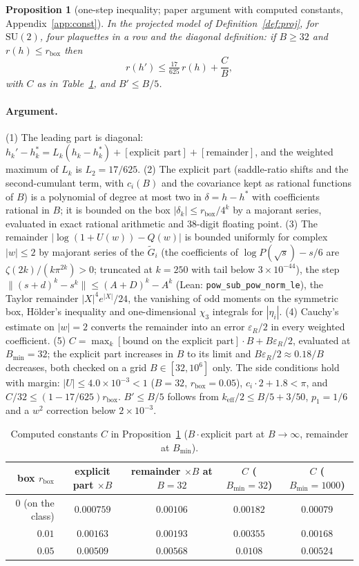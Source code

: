 \documentclass[11pt,a4paper]{article}
\newtheorem{proposition}[lemma]{Proposition}
\theoremstyle{definition}
\theoremstyle{remark}
\newcommand{\SU}{\mathrm{SU}(2)}
\newcommand{\code}[1]{\texttt{#1}}
\begin{document}
\begin{proposition}[one-step inequality; paper argument with computed constants, Appendix~\ref{app:const}]\label{prop:onestep}
In the projected model of Definition~\ref{def:proj}, for $\SU$, four plaquettes in a row and the diagonal definition: if $B\ge32$ and $r(h)\le r_{\mathrm{box}}$ then
\[
r(h')\le\tfrac{17}{625}\,r(h)+\frac{C}{B},
\]
with $C$ as in Table~\ref{tab:C}, and $B'\le B/5$.
\end{proposition}

\paragraph{Argument.}
(1) The leading part is diagonal: $h_k'-h_k^*=L_k(h_k-h_k^*)+[\text{explicit part}]+[\text{remainder}]$, and the weighted maximum of $L_k$ is $L_2=17/625$.
(2) The explicit part (saddle-ratio shifts and the second-cumulant term, with $c_i(B)$ and the covariance kept as rational functions of $B$) is a polynomial of degree at most two in $\delta=h-h^*$ with coefficients rational in $B$; it is bounded on the box $|\delta_k|\le r_{\mathrm{box}}/4^k$ by a majorant series, evaluated in exact rational arithmetic and 38-digit floating point.
(3) The remainder $|\log(1+U(w))-Q(w)|$ is bounded uniformly for complex $|w|\le2$ by majorant series of the $\tilde G_i$ (the coefficients of $\log P(\sqrt s)-s/6$ are $\zeta(2k)/(k\pi^{2k})>0$; truncated at $k=250$ with tail below $3\times10^{-44}$), the step $\|(s+d)^k-s^k\|\le(A+D)^k-A^k$ (Lean: \code{pow\_sub\_pow\_norm\_le}), the Taylor remainder $|X|^4e^{|X|}/24$, the vanishing of odd moments on the symmetric box, H\"older's inequality and one-dimensional $\chi_3$ integrals for $|\eta_i|$.
(4) Cauchy's estimate on $|w|=2$ converts the remainder into an error $\varepsilon_R/2$ in every weighted coefficient.
(5) $C=\max_k[\text{bound on the explicit part}]\cdot B+B\varepsilon_R/2$, evaluated at $B_{\min}=32$; the explicit part increases in $B$ to its limit and $B\varepsilon_R/2\approx0.18/B$ decreases, both checked on a grid $B\in[32,10^6]$ only.
The side conditions hold with margin: $|U|\le4.0\times10^{-3}<1$ ($B=32$, $r_{\mathrm{box}}=0.05$), $c_i\cdot2+1.8<\pi$, and $C/32\le(1-17/625)r_{\mathrm{box}}$.
$B'\le B/5$ follows from $k_{\mathrm{eff}}/2\le B/5+3/50$, $p_1=1/6$ and a $w^2$ correction below $2\times10^{-3}$.

\begin{table}[h]
\centering\small
\caption{Computed constants $C$ in Proposition~\ref{prop:onestep} ($B\cdot$explicit part at $B\to\infty$, remainder at $B_{\min}$).}\label{tab:C}
\begin{tabular}{@{}rcccc@{}}
\toprule
box $r_{\mathrm{box}}$ & explicit part $\times B$ & remainder $\times B$ at $B=32$ & $C$ ($B_{\min}=32$) & $C$ ($B_{\min}=1000$)\\ \midrule
$0$ (on the class) & $0.000759$ & $0.00106$ & $0.00182$ & $0.00079$\\
$0.01$ & $0.00163$ & $0.00193$ & $0.00355$ & $0.00168$\\
$0.05$ & $0.00509$ & $0.00568$ & $0.0108$ & $0.00524$\\
\bottomrule
\end{tabular}
\end{table}
\end{document}
